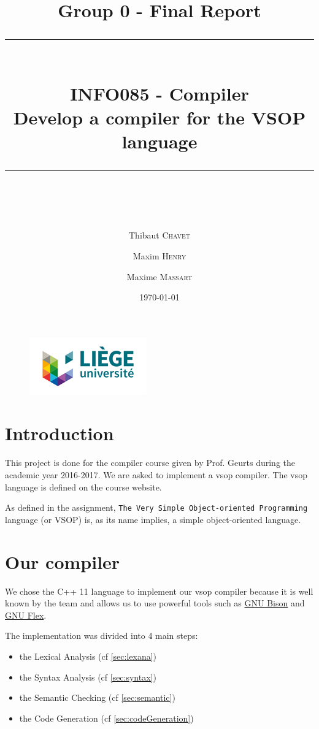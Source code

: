 \documentclass[a4paper,11pt]{article}
\title{
Group 0 - Final Report
\rule{\linewidth}{0.2 mm} \\[0.4 cm]
\Large{\textbf{INFO085 - Compiler}} \\
Develop a compiler for the VSOP language
\rule{\linewidth}{0.2 mm} \\[0.4 cm]
\vspace*{8 cm}
}
\date{\today}
\author{Thibaut \textsc{Chavet} \and Maxim \textsc{Henry} \and Maxime \textsc{Massart}}
\begin{document}
\begin{figure}
\begin{center}
\includegraphics[scale = 1]{logoulg}
\end{center}
\end{figure}

\maketitle
\setcounter{page}{0}
\thispagestyle{empty}


\tableofcontents
\thispagestyle{empty}
\setcounter{page}{0}
\newpage

% 
% 
% 
% 
% 
% 

\section{Introduction}
This project is done for the compiler course given by Prof. Geurts during the academic year 2016-2017. 
We are asked to implement a vsop compiler. The vsop language is defined on the course website.

As defined in the assignment, \texttt{The Very Simple Object-oriented Programming} language (or VSOP) is, 
as its name implies, a simple object-oriented language.



\section{Our compiler}
We chose the C++ 11 language to implement our vsop compiler  because it is well known by the team and allows us
to use powerful tools such as \href{http://www.gnu.org/software/bison/}{GNU Bison} and 
\href{https://github.com/westes/flex}{GNU Flex}.

The implementation was divided into 4 main steps: 
\begin{itemize}
 \item the Lexical Analysis (cf \ref{sec:lexana})
 \item the Syntax Analysis (cf \ref{sec:syntax})
 \item the Semantic Checking (cf \ref{sec:semantic})
 \item the Code Generation (cf \ref{sec:codeGeneration}) 
\end{itemize}
\end{document}
